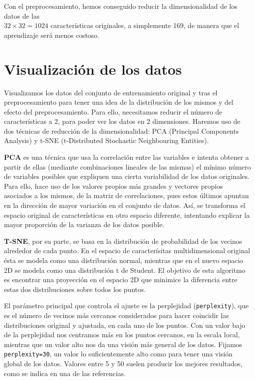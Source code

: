 \documentclass[a4]{article}
\begin{document}
Con el preprocesamiento, hemos conseguido reducir la dimensionalidad de los datos de las\\ $32\times32=1024$ características originales, a simplemente 169, de manera que el aprendizaje será menos costoso. 

\section{Visualización de los datos}

Visualizamos los datos del conjunto de entrenamiento original y tras el preprocesamiento para tener una idea de la distribución de los mismos y del efecto del preprocesamiento. 
Para ello, necesitamos reducir el número de características a 2, para poder ver los datos en 2 dimensiones. Haremos uso de dos técnicas de reducción de la dimensionalidad: PCA (Principal Components Analysis) y t-SNE (t-Distributed Stochastic Neighbouring Entities). 

\textbf{PCA} es una técnica que usa la correlación entre las variables e intenta obtener a partir de ellas (mediante combinaciones lineales de las mismas) el mínimo número de variables posibles que expliquen una cierta variabilidad de los datos originales. Para ello, hace uso de los valores propios más grandes y vectores propios asociados a los mismos, de la matriz de correlaciones, pues estos últimos apuntan en la dirección de mayor variación en el conjunto de datos. Así, se transforma el espacio original de características en otro espacio diferente, intentando explicar la mayor proporción de la varianza de los datos posible. 

\textbf{T-SNE}, por su parte, se basa en la distribución de probabilidad de los vecinos alrededor de cada punto. En el espacio de caracterísitas multidimensional original ésta se modela como una distribución normal, mientras que en el nuevo espacio 2D se modela como una distribución t de Student. El objetivo de esta algoritmo es encontrar una proyección en el espacio 2D que minimice la diferencia entre estas dos distribuciones sobre todos los puntos. 

El parámetro principal que controla el ajuste es la perplejidad (\lstinline|perplexity|), que es el número de vecinos más cercanos considerados para hacer coincidir las distribuciones original y ajustada, en cada uno de los puntos. Con un valor bajo de la perplejidad nos centramos más en los puntos cercanos, en la escala local, mientras que un valor alto nos da una visión más general de los datos. Fijamos\\ \lstinline|perplexity=30|, un valor lo suficientemente alto como para tener una visión global de los datos. Valores entre 5 y 50 suelen producir los mejores resultados, como se indica en una de las referencias. 
\end{document}
